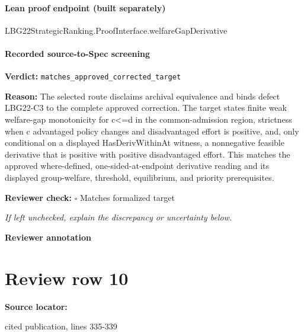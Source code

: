 \documentclass[10pt]{article}
\newcommand{\reviewerbox}{%
  \par\noindent\fbox{\parbox{0.96\linewidth}{\rule{0pt}{0.38in}}}\par
}
\newcommand{\reviewmatch}[1]{%
  \par\noindent\textbf{Reviewer check:} $\square$\; #1\par
  \noindent\emph{If left unchecked, explain the discrepancy or uncertainty below.}\par
}
\begin{document}
\paragraph{Lean proof endpoint (built separately)}\begin{ReviewVerbatim}
LBG22StrategicRanking.ProofInterface.welfareGapDerivative
\end{ReviewVerbatim}

\paragraph{Recorded source-to-Spec screening}
\textbf{Verdict:} \texttt{matches\_approved\_corrected\_target}
\\
{\raggedright
\textbf{Reason:} The selected route disclaims archival equivalence and binds defect LBG22-\allowbreak{}C3 to the complete approved correction.\allowbreak{} The target states finite weak welfare-\allowbreak{}gap monotonicity for c<=d in the common-\allowbreak{}admission region, strictness when c advantaged policy changes and disadvantaged effort is positive, and, only conditional on a displayed HasDerivWithinAt witness, a nonnegative feasible derivative that is positive with positive disadvantaged effort.\allowbreak{} This matches the approved where-\allowbreak{}defined, one-\allowbreak{}sided-\allowbreak{}at-\allowbreak{}endpoint derivative reading and its displayed group-\allowbreak{}welfare, threshold, equilibrium, and priority prerequisites.\allowbreak{}
\par}
\reviewmatch{Matches formalized target}
\noindent\textbf{Reviewer annotation}\par
\reviewerbox
\clearpage
\hypertarget{source-claim-dcc0514ddd510442}{}
\section*{Review row 10}
\textbf{Source locator:} {\footnotesize\raggedright cited publication, lines 335-\allowbreak{}339\par}
\end{document}
